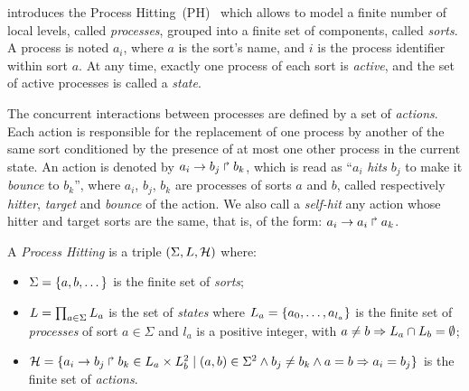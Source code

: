 

 introduces the Process Hitting~(PH)~\cite{PMR10-TCSB}
which allows to model a finite number of local levels,
called \emph{processes},
grouped into a finite set of components, called \emph{sorts}.
A process is noted $a_i$, where $a$ is the sort's name,
and $i$ is the process identifier within sort $a$.
At any time, exactly one process of each sort is \emph{active},
and the set of active processes is called a \emph{state}.

The concurrent interactions between processes are defined by a set of \emph{actions}.
Each action is responsible for the replacement of one process by another of the same sort
conditioned by the presence of at most one other process in the current state.
An action is denoted by $a_i\rightarrow b_j\Rsh b_k$, which is read as
“$a_i$ \emph{hits} $b_j$ to make it \emph{bounce} to $b_k$”,
where $a_i$, $b_j$, $b_k$ are processes of sorts $a$ and $b$,
called respectively \emph{hitter}, \emph{target} and
\emph{bounce} of the action.
We also call a \emph{self-hit} any action whose hitter and target sorts are the same,
that is, of the form: $a_i\rightarrow a_i\Rsh a_k$.

\begin{definition}\label{def:PH}
  A \emph{Process Hitting} is a triple $(\Sigma,L,\mathcal{H})$ where:
  \begin{itemize}
    \item  $\Sigma = \{a,b,\dots\}$ is the finite set of \emph{sorts};
    \item  $L = \prod_{a\in\Sigma} L_a$ is the set of \emph{states} where
      $L_a = \{a_0,\dots,a_{l_a}\}$
      is the finite set of \emph{processes} of sort $a\in\Sigma$
      and $l_a$ is a positive integer, with $a\neq b\Rightarrow L_a \cap L_b = \emptyset$;
    \item  $\mathcal{H} = \{ a_i\rightarrow b_j\Rsh b_k \in L_a \times L_b^2 \mid
      (a,b) \in \Sigma^2 \wedge b_j\neq b_k \wedge a=b\Rightarrow a_i=b_j\}$
      is the finite set of \emph{actions}.
  \end{itemize}
\end{definition}


